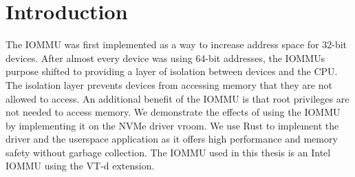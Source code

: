 \chapter{Introduction}\label{c:introduction}

The IOMMU was first implemented as a way to increase address space for 32-bit devices.
After almost every device was using 64-bit addresses, the IOMMUs purpose shifted to providing a layer of isolation between devices and the CPU. \cite{OLS2007}
The isolation layer prevents devices from accessing memory that they are not allowed to access.
An additional benefit of the IOMMU is that root privileges are not needed to access memory.
We demonstrate the effects of using the IOMMU by implementing it on the NVMe driver vroom. \cite{vroom}
We use Rust to implement the driver and the userspace application as it offers high performance and memory safety without garbage collection.
The IOMMU used in this thesis is an Intel IOMMU using the VT-d extension.